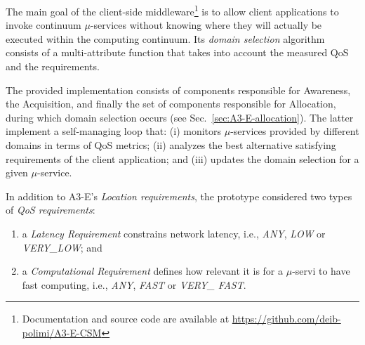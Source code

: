 
The main goal of the client-side middleware\footnote{Documentation and source code are available at \url{https://github.com/deib-polimi/A3-E-CSM}} is to allow client applications to invoke continuum $\mu$-services without knowing where they will actually be executed within the computing continuum.
Its \textit{domain selection} algorithm consists of a multi-attribute function that takes into account the measured QoS and the requirements. %

The provided implementation consists of components responsible for Awareness, the Acquisition, and finally the set of  components responsible for Allocation, during which domain selection occurs (see Sec.~\ref{sec:A3-E-allocation}). The latter implement a self-managing loop that: (i) monitors $\mu$-services provided by different domains in terms of QoS metrics; (ii) analyzes the best alternative satisfying requirements of the client application; and (iii) updates the domain selection for a given $\mu$-service. 

In addition to A3-E's \textit{Location requirements}, the prototype considered two types of \textit{QoS requirements}:

\begin{enumerate}
	
	
	\item a \textit{Latency Requirement} constrains network latency, i.e., \textit{ANY}, \textit{LOW} or \textit{VERY\_LOW}; and 
	
	\item a \textit{Computational Requirement} defines how relevant it is for a $\mu$-servi to have fast computing, i.e., \textit{ANY}, \textit{FAST} or \textit{VERY\_ FAST}. 
\end{enumerate}

